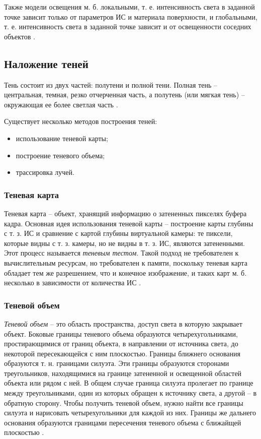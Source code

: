 Также модели освещения м. б. локальными, т. е. интенсивность света в заданной точке зависит только от параметров ИС и материала поверхности, и глобальными, т. е. интенсивность света в заданной точке зависит и от освещенности соседних объектов \cite{rogers}.

\subsection{Наложение теней}

Тень состоит из двух частей: полутени и полной тени. Полная тень -- центральная, темная, резко отчерченная часть, а полутень (или мягкая тень) -- окружающая ее более светлая часть \cite{rogers}.

Существует несколько методов построения теней:

\begin{itemize}
	\item использование теневой карты;
	\item построение теневого объема;
	\item трассировка лучей.
\end{itemize}

\subsubsection*{Теневая карта}

Теневая карта -- объект, хранящий информацию о затененных пикселях буфера кадра. Основная идея использования теневой карты -- построение карты глубины с т. з. ИС и сравнение с картой глубины виртуальной камеры: те пиксели, которые видны с т. з. камеры, но не видны в т. з. ИС, являются затененными. Этот процесс называется \textit{теневым тестом}. Такой подход не требователен к вычислительным ресурсам, но требователен к памяти, поскольку теневая карта обладает тем же разрешением, что и конечное изображение, и таких карт м. б. несколько в зависимости от количества ИС \cite{engel2008programming}.

\subsubsection*{Теневой объем}

\textit{Теневой объем} -- это область пространства, доступ света в которую закрывает объект. Боковые границы теневого объема образуются четырехугольниками, простирающимися от границ объекта, в направлении от источника света, до некоторой пересекающейся с ним плоскостью. Границы ближнего основания образуются т. н. границами силуэта. Эти границы образуются сторонами треугольников, находящимися на границе затененной и освещенной областей объекта или рядом с ней. В общем случае граница силуэта пролегает по границе между треугольниками, один из которых обращен к источнику света, а другой -- в обратную сторону. Чтобы получить теневой объем, нужно найти все границы силуэта и нарисовать четырехугольники для каждой из них. Границы же дальнего основания образуются границами пересечения теневого объема с ближайщей плоскостью \cite{shad_vol}.

